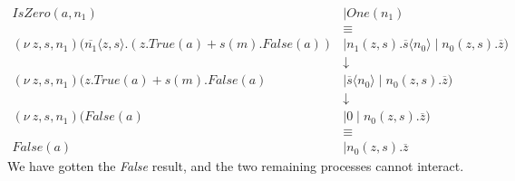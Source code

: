 \documentclass[a4paper, openany]{memoir}
\theoremstyle{definition}
\begin{document}
    \begin{align*}
        \textit{IsZero}(a, n_1) &\mid \textit{One}(n_1) \\
        &\equiv \\
        (\nu \ z, s, n_1)(\overline{n_1} \langle z, s \rangle.(z.\textit{True}(a) + s(m).\textit{False}(a)) &\mid n_1(z, s). \overline{s} \langle n_0 \rangle \mid n_0(z, s).\overline{z}) \\
        &\downarrow \\
        (\nu \ z, s, n_1)(z.\textit{True}(a) + s(m).\textit{False}(a) &\mid \overline{s} \langle n_0 \rangle \mid n_0(z, s).\overline{z}) \\
        &\downarrow \\
        (\nu \ z, s, n_1)(\textit{False}(a) &\mid 0 \mid n_0(z, s).\overline{z}) \\
        &\equiv \\
        \textit{False}(a) &\mid n_0(z, s).\overline{z}
    \end{align*}
    We have gotten the \textit{False} result, and the two remaining processes cannot interact.
\end{document}
